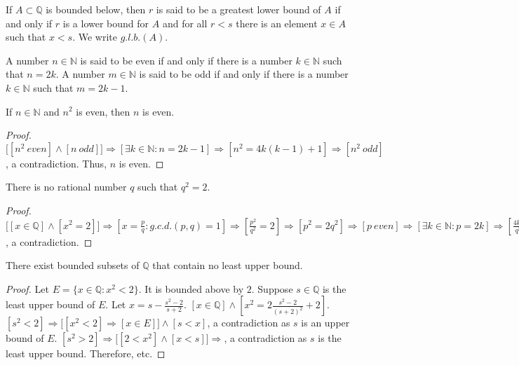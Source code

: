 \documentclass[crop=false,class=article,oneside]{standalone}
\begin{document}
            \begin{definition}
            If $A\subset \mathbb{Q}$ is bounded below, then $r$ is said to be a greatest lower bound of $A$ if and only if $r$ is a lower bound for $A$ and for all $r<s$ there is an element $x\in A$ such that $x<s$. We write $g.l.b.(A)$.
            \end{definition}
            \begin{definition}
            A number $n\in \mathbb{N}$ is said to be even if and only if there is a number $k\in \mathbb{N}$ such that $n=2k$. A number $m\in \mathbb{N}$ is said to be odd if and only if there is a number $k\in \mathbb{N}$ such that $m=2k-1$.
            \end{definition}
            \begin{lemma}
            If $n\in \mathbb{N}$ and $n^2$ is even, then $n$ is even.
            \end{lemma}
            \begin{proof}
            $\big[[n^2\ even]\land [n\ odd]\big]\Rightarrow [\exists k\in \mathbb{N}:n=2k-1]\Rightarrow [n^2 = 4k(k-1)+1]\Rightarrow [n^2\ odd]$, a contradiction. Thus, $n$ is even.
            \end{proof}
            \begin{theorem}
            There is no rational number $q$ such that $q^2 = 2$.
            \end{theorem}
            \begin{proof}
            $\big[[x\in \mathbb{Q}]\land [x^2=2]\big]\Rightarrow [x= \frac{p}{q}:g.c.d.(p,q)=1]\Rightarrow [\frac{p^2}{q^2}= 2]\Rightarrow [p^2 = 2q^2]\Rightarrow [p\ even]\Rightarrow [\exists k\in \mathbb{N}:p=2k]\Rightarrow [\frac{4k^2}{q^2}=2]\Rightarrow [q^2 = 2k^2]\Rightarrow [q\ even]\Rightarrow [g.c.d.(p,q)\geq 2]$, a contradiction.
            \end{proof}
            \begin{theorem}
            There exist bounded subsets of $\mathbb{Q}$ that contain no least upper bound.
            \end{theorem}
            \begin{proof}
            Let $E=\{x\in \mathbb{Q}:x^2 < 2\}$. It is bounded above by $2$. Suppose $s\in \mathbb{Q}$ is the least upper bound of $E$. Let $x = s - \frac{s^2-2}{s+2}$. $[x\in \mathbb{Q}] \land [x^2 = 2\frac{s^2-2}{(s+2)^2}+2]$. $[s^2<2]\Rightarrow \big[[x^2<2 ]\Rightarrow [x\in E]\big]\land [s<x]$, a contradiction as $s$ is an upper bound of $E$. $[s^2>2]\Rightarrow \big[[2<x^2 ]\land [x<s]\big]\Rightarrow$, a contradiction as $s$ is the least upper bound. Therefore, etc.
            \end{proof}
\end{document}
